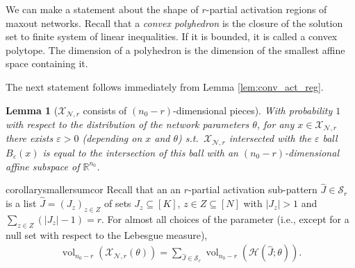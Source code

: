 \documentclass{article}
\newtheorem{lemma}[theorem]{Lemma}
\theoremstyle{definition}
\newcommand{\net}{\mathcal{N}}
\newcommand{\nin}{n_0}
\newcommand{\vol}{\operatorname{vol}}
\begin{document}
We can make a statement about the shape of $r$-partial activation regions of maxout networks.
Recall that a \emph{convex polyhedron} is the closure of the solution set to finite system of linear inequalities.
If it is bounded, it is called a convex polytope.
The dimension of a polyhedron is the dimension of the smallest affine space containing it. 

The next statement follows immediately from Lemma \ref{lem:conv_act_reg}.
    \begin{lemma}[$\mathcal{X}_{\net, r}$ consists of $(\nin -r)$-dimensional pieces]
        \label{lem:hyperplane_ball}
        With probability $1$ with respect to the distribution of the network parameters $\theta$, for any $x \in \mathcal{X}_{\net, r}$ there exists $\varepsilon > 0$ (depending on $x$ and $\theta$) s.t.\ $\mathcal{X}_{\net, r}$ intersected with the $\varepsilon$ ball $B_{\varepsilon}(x)$ is equal to the intersection of this ball with an $(\nin - r)$-dimensional affine subspace of $\mathbb{R}^{\nin}$.
    \end{lemma} 
    
    \begin{restatable}{corollary}{smallersumcor}
        \label{cor:smaller_sum}
        Recall that an an $r$-partial activation sub-pattern $\hat{J} \in \mathcal{S}_r$ is a list $\hat{J} = (J_z)_{z\in Z}$ of sets $J_z\subseteq [K]$, $z\in Z\subseteq[N]$ with $|J_z|>1$ and $\sum_{z \in Z} (|J_z| - 1) = r$. 
        For almost all choices of the parameter (i.e., except for a null set  with respect to the Lebesgue measure), 
        \begin{align*}
            \vol_{\nin - r} \left( \mathcal{X}_{\net, r}(\theta)\right)
            = \sum_{\hat{J} \in\mathcal{S}_r} \vol_{\nin - r} (\mathcal{H}(\hat{J} ;\theta)). 
        \end{align*}    
    \end{restatable}
\end{document}
